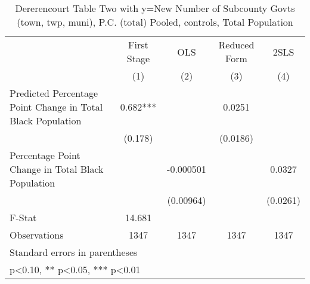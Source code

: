 \begin{table}[htbp]\centering
\def\sym#1{\ifmmode^{#1}\else\(^{#1}\)\fi}
\caption{Dererencourt Table Two with y=New Number of Subcounty Govts (town, twp, muni), P.C. (total)  Pooled,  controls, Total Population}
\begin{tabular}{l*{4}{c}}
\toprule
                    & First Stage   &         OLS   &Reduced Form   &        2SLS   \\
                    &\multicolumn{1}{c}{(1)}   &\multicolumn{1}{c}{(2)}   &\multicolumn{1}{c}{(3)}   &\multicolumn{1}{c}{(4)}   \\
\midrule
Predicted Percentage Point Change in Total Black Population&       0.682***&               &      0.0251   &               \\
                    &     (0.178)   &               &    (0.0186)   &               \\
\addlinespace
Percentage Point Change in Total Black Population&               &   -0.000501   &               &      0.0327   \\
                    &               &   (0.00964)   &               &    (0.0261)   \\
\midrule
F-Stat              &      14.681   &               &               &               \\
Observations        &        1347   &        1347   &        1347   &        1347   \\
\bottomrule
\multicolumn{5}{l}{\footnotesize Standard errors in parentheses}\\
\multicolumn{5}{l}{\footnotesize * p<0.10, ** p<0.05, *** p<0.01}\\
\end{tabular}
\end{table}
